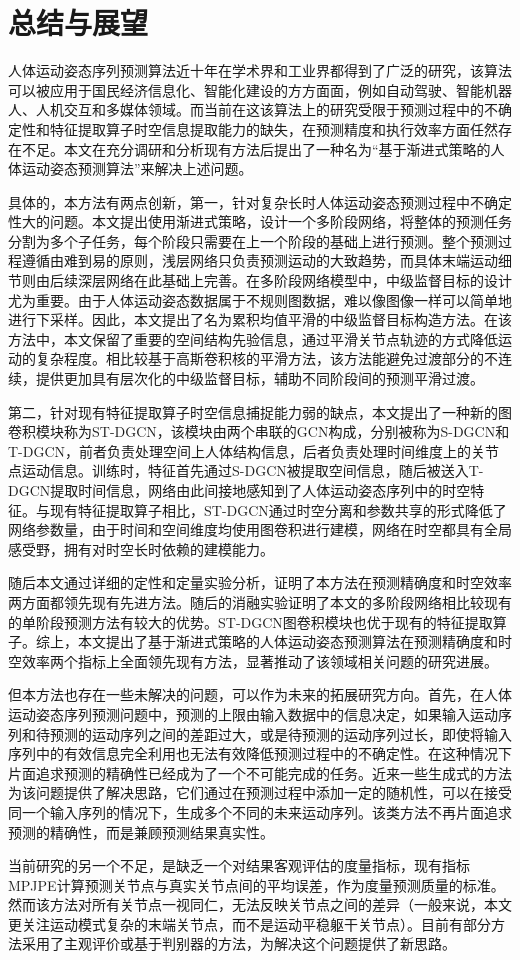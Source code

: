 \chapter{总结与展望}
人体运动姿态序列预测算法近十年在学术界和工业界都得到了广泛的研究，该算法可以被应用于国民经济信息化、智能化建设的方方面面，例如自动驾驶、智能机器人、人机交互和多媒体领域。而当前在这该算法上的研究受限于预测过程中的不确定性和特征提取算子时空信息提取能力的缺失，在预测精度和执行效率方面任然存在不足。本文在充分调研和分析现有方法后提出了一种名为“基于渐进式策略的人体运动姿态预测算法”来解决上述问题。

具体的，本方法有两点创新，第一，针对复杂长时人体运动姿态预测过程中不确定性大的问题。本文提出使用渐进式策略，设计一个多阶段网络，将整体的预测任务分割为多个子任务，每个阶段只需要在上一个阶段的基础上进行预测。整个预测过程遵循由难到易的原则，浅层网络只负责预测运动的大致趋势，而具体末端运动细节则由后续深层网络在此基础上完善。在多阶段网络模型中，中级监督目标的设计尤为重要。由于人体运动姿态数据属于不规则图数据，难以像图像一样可以简单地进行下采样。因此，本文提出了名为累积均值平滑的中级监督目标构造方法。在该方法中，本文保留了重要的空间结构先验信息，通过平滑关节点轨迹的方式降低运动的复杂程度。相比较基于高斯卷积核的平滑方法，该方法能避免过渡部分的不连续，提供更加具有层次化的中级监督目标，辅助不同阶段间的预测平滑过渡。

第二，针对现有特征提取算子时空信息捕捉能力弱的缺点，本文提出了一种新的图卷积模块称为ST-DGCN，该模块由两个串联的GCN构成，分别被称为S-DGCN和T-DGCN，前者负责处理空间上人体结构信息，后者负责处理时间维度上的关节点运动信息。训练时，特征首先通过S-DGCN被提取空间信息，随后被送入T-DGCN提取时间信息，网络由此间接地感知到了人体运动姿态序列中的时空特征。与现有特征提取算子相比，ST-DGCN通过时空分离和参数共享的形式降低了网络参数量，由于时间和空间维度均使用图卷积进行建模，网络在时空都具有全局感受野，拥有对时空长时依赖的建模能力。

随后本文通过详细的定性和定量实验分析，证明了本方法在预测精确度和时空效率两方面都领先现有先进方法。随后的消融实验证明了本文的多阶段网络相比较现有的单阶段预测方法有较大的优势。ST-DGCN图卷积模块也优于现有的特征提取算子。综上，本文提出了基于渐进式策略的人体运动姿态预测算法在预测精确度和时空效率两个指标上全面领先现有方法，显著推动了该领域相关问题的研究进展。

但本方法也存在一些未解决的问题，可以作为未来的拓展研究方向。首先，在人体运动姿态序列预测问题中，预测的上限由输入数据中的信息决定，如果输入运动序列和待预测的运动序列之间的差距过大，或是待预测的运动序列过长，即使将输入序列中的有效信息完全利用也无法有效降低预测过程中的不确定性。在这种情况下片面追求预测的精确性已经成为了一个不可能完成的任务。近来一些生成式的方法为该问题提供了解决思路，它们通过在预测过程中添加一定的随机性，可以在接受同一个输入序列的情况下，生成多个不同的未来运动序列。该类方法不再片面追求预测的精确性，而是兼顾预测结果真实性。

当前研究的另一个不足，是缺乏一个对结果客观评估的度量指标，现有指标MPJPE计算预测关节点与真实关节点间的平均误差，作为度量预测质量的标准。然而该方法对所有关节点一视同仁，无法反映关节点之间的差异（一般来说，本文更关注运动模式复杂的末端关节点，而不是运动平稳躯干关节点）。目前有部分方法采用了主观评价或基于判别器的方法，为解决这个问题提供了新思路。